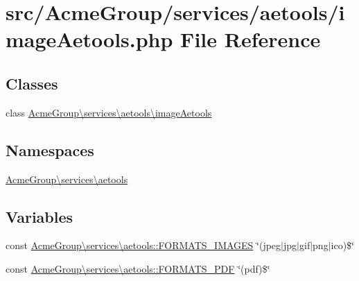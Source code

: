 \hypertarget{image_aetools_8php}{\section{src/\+Acme\+Group/services/aetools/image\+Aetools.php File Reference}
\label{image_aetools_8php}
}
\subsection*{Classes}
\begin{DoxyCompactItemize}
\item 
class \hyperlink{class_acme_group_1_1services_1_1aetools_1_1image_aetools}{Acme\+Group\textbackslash{}services\textbackslash{}aetools\textbackslash{}image\+Aetools}
\end{DoxyCompactItemize}
\subsection*{Namespaces}
\begin{DoxyCompactItemize}
\item 
 \hyperlink{namespace_acme_group_1_1services_1_1aetools}{Acme\+Group\textbackslash{}services\textbackslash{}aetools}
\end{DoxyCompactItemize}
\subsection*{Variables}
\begin{DoxyCompactItemize}
\item 
const \hyperlink{namespace_acme_group_1_1services_1_1aetools_a0849bde87c435d7dae7aa47884ea40d9}{Acme\+Group\textbackslash{}services\textbackslash{}aetools\+::\+F\+O\+R\+M\+A\+T\+S\+\_\+\+I\+M\+A\+G\+E\+S} \char`\"{}(jpeg$\vert$jpg$\vert$gif$\vert$png$\vert$ico)\$\char`\"{}
\item 
const \hyperlink{namespace_acme_group_1_1services_1_1aetools_ab6aff9e01b34cb1b72532617114cfc28}{Acme\+Group\textbackslash{}services\textbackslash{}aetools\+::\+F\+O\+R\+M\+A\+T\+S\+\_\+\+P\+D\+F} \char`\"{}(pdf)\$\char`\"{}
\end{DoxyCompactItemize}
